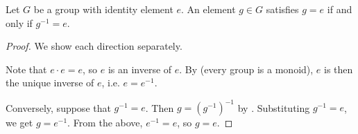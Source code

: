 \begin{lemma}
\label{lemma:group_element_is_identity_iff_its_inverse_is_identity}
Let $G$ be a group with identity element $e$. An element $g \in G$ satisfies $g = e$ if and only if $g^{-1} = e$.
\end{lemma}

\begin{proof}
We show each direction separately.

Note that $e \cdot e = e$, so $e$ is an inverse of $e$. By  (every group is a monoid), $e$ is then the unique inverse of $e$, i.e. $e = e^{-1}$.

Conversely, suppose that $g^{-1} = e$. Then $g = (g^{-1})^{-1}$ by . Substituting $g^{-1} = e$, we get $g = e^{-1}$. From the above, $e^{-1} = e$, so $g = e$.
\end{proof}